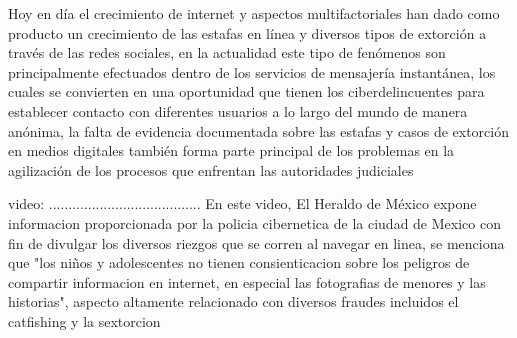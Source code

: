 


Hoy en día el crecimiento de internet y aspectos multifactoriales han dado como producto un crecimiento de las estafas en línea y diversos tipos de extorción a través de las redes sociales, en la actualidad este tipo de fenómenos son principalmente efectuados dentro de los servicios de mensajería instantánea, los cuales se convierten en una oportunidad que tienen los
ciberdelincuentes para establecer contacto con diferentes usuarios a lo largo del mundo de manera anónima, la falta de
evidencia documentada sobre las estafas y casos de extorción en medios digitales también forma parte principal de los problemas en la agilización de los procesos que enfrentan las autoridades judiciales

video:
.......................................
En este video, El Heraldo de México expone informacion proporcionada por la policia cibernetica de la ciudad de Mexico con fin de divulgar los diversos riezgos que se corren al navegar en linea, se menciona que "los niños y adolescentes no tienen consienticacion sobre los peligros de compartir informacion en internet, en especial las fotografias de menores y las historias", aspecto altamente relacionado con diversos fraudes incluidos el catfishing y la sextorcion



